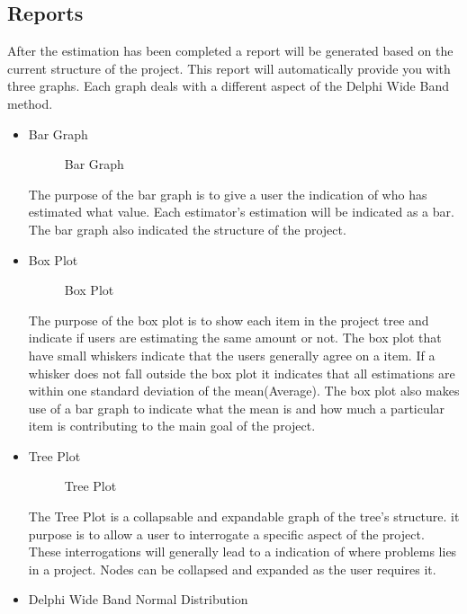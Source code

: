 \subsection{Reports}
After the estimation has been completed a report will be generated based on the current structure of the project. This report will automatically provide you with three graphs. Each graph deals with a different aspect of the Delphi Wide Band method. 
\begin{itemize}
	\item{Bar Graph}
		\begin{figure}[H]
	    	\centering
	    	\caption{Bar Graph}
	    	\label{fig:Bar Graph}
   	\end{figure}
	The purpose of the bar graph is to give a user the indication of who has estimated what value. Each estimator's estimation will be indicated as a bar. The bar graph also indicated the structure of the project. 
	\item{Box Plot}
	\begin{figure}[H]
	    	\centering
	    	\caption{Box Plot}
	    	\label{fig:Box Plot}
   	\end{figure}
	The purpose of the box plot is to show each item in the project tree and indicate if users are estimating the same amount or not. The box plot that have small whiskers indicate that the users generally agree on a item. If a whisker does not fall outside the box plot it indicates that all estimations are within one standard deviation of the mean(Average). The box plot also makes use of a bar graph to indicate what the mean is and how much a particular item is contributing to the main goal of the project.
	\item{Tree Plot}
	\begin{figure}[H]
	    	\centering
	    	\caption{Tree Plot}
	    	\label{fig:Tree Plot}
   	\end{figure}
	The Tree Plot is a collapsable and expandable graph of the tree's structure. it purpose is to allow a user to interrogate a specific aspect of the project. These interrogations will generally lead to a indication of where problems lies in a project. Nodes can be collapsed and expanded as the user requires it. 
	\item{Delphi Wide Band Normal Distribution}
	\begin{figure}[H]
	    	\centering

\end{figure}
\end{itemize}
